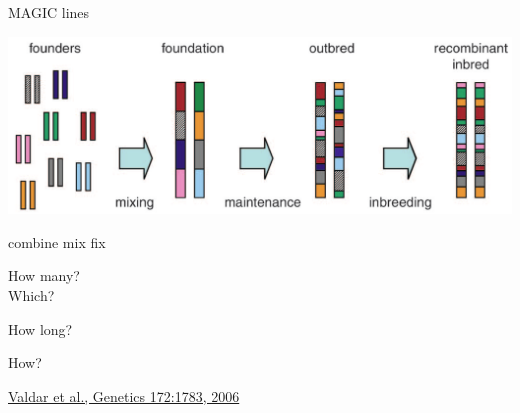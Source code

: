 \documentclass[12pt]{article}
\newcommand{\headsize}{\fontsize{35}{35} \selectfont}
\newcommand{\smallsize}{\fontsize{25}{30} \selectfont}
\newcommand{\smallersize}{\fontsize{20}{25} \selectfont}
\newcommand{\smallestsize}{\fontsize{18}{22} \selectfont}
\begin{document}
\newpage


\addtocounter{page}{-1}

\headsize \color{myyellow}
\hfill \begin{minipage}{5.75in}
\centering
MAGIC lines
\end{minipage}

\vspace{20mm}

\centerline{\includegraphics[width=10in]{Figs/valdar_genet2006.png}}

\smallsize \color{myyellow}
\hspace*{52mm} combine \hspace*{35mm} mix \hspace*{52mm} fix

\smallersize
\color{mywhite}
\vspace{20pt}

\hspace*{6mm}
\begin{minipage}[t]{45mm}
\vspace*{0mm}
\centering

How many? \\[20pt]
Which?
\end{minipage}
\hspace{57mm}
\begin{minipage}[t]{45mm}
\vspace*{0mm}
\centering

How long?
\end{minipage}
\hspace{18mm}
\begin{minipage}[t]{45mm}
\vspace*{0mm}
\centering

How?
\end{minipage}


\vfill

\hfill {\smallestsize \color{myblue} \href{http://www.genetics.org/content/172/3/1783.full}{Valdar et al., Genetics 172:1783, 2006}}
\end{document}
